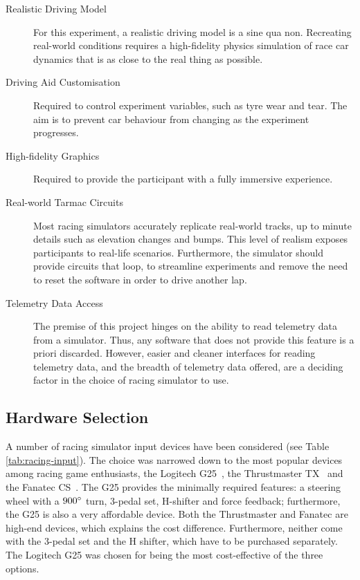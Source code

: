 \begin{description}
	\begin{description}
		\item [Realistic Driving Model] For this experiment, a realistic driving model is a sine qua non. Recreating real-world conditions requires a high-fidelity physics simulation of race car dynamics that is as close to the real thing as possible.
		\item [Driving Aid Customisation] Required to control experiment variables, such as tyre wear and tear. The aim is to prevent car behaviour from changing as the experiment progresses. 
		\item [High-fidelity Graphics] Required to provide the participant with a fully immersive experience.
		\item [Real-world Tarmac Circuits] Most racing simulators accurately replicate real-world tracks, up to minute details such as elevation changes and bumps. This level of realism exposes participants to real-life scenarios. Furthermore, the simulator should provide circuits that loop, to streamline experiments and remove the need to reset the software in order to drive another lap.  
		\item [Telemetry Data Access] The premise of this project hinges on the ability to read telemetry data from a simulator. Thus, any software that does not provide this feature is a priori discarded. However, easier and cleaner interfaces for reading telemetry data, and the breadth of telemetry data offered, are a deciding factor in the choice of racing simulator to use.
	\end{description}
\end{description}

\subsection{Hardware Selection}
A number of racing simulator input devices have been considered (see Table \ref{tab:racing-input}). The choice was narrowed down to the most popular devices among racing game enthusiasts, the Logitech G25~\cite{logitecg25}, the Thrustmaster TX~\cite{TrustmasterTX} and the Fanatec CS~\cite{Fanatec}. The G25 provides the minimally required features: a steering wheel with a $900\degree$ turn, 3-pedal set, H-shifter and force feedback; furthermore, the G25 is also a very affordable device. Both the Thrustmaster and Fanatec are high-end devices, which explains the cost difference. Furthermore, neither come with the 3-pedal set and the H shifter, which have to be purchased separately. The Logitech G25 was chosen for being the most cost-effective of the three options.

